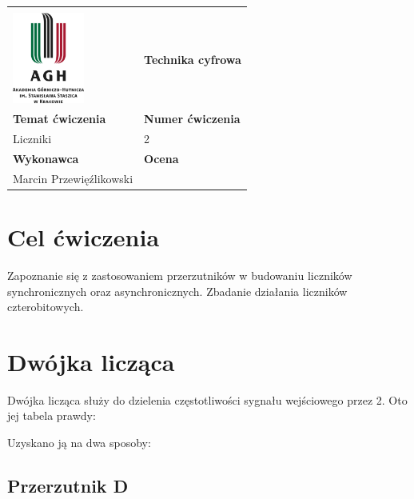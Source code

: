 \documentclass[12pt,a4paper]{article}
\begin{document}
\begin{table}[]
\label{my-label}
\begin{tabular}{|p{7.5cm}|p{7.5cm}|}
\hline
									           					&                           \\
\includegraphics[height=3cm]{logo}             					& \textbf{Technika cyfrowa} \\ \hline
\multicolumn{1}{|l|}{\textbf{Temat ćwiczenia}} 					& \textbf{Numer ćwiczenia}  \\
\multicolumn{1}{|l|}{Liczniki}	& 2                         \\ \hline
\multicolumn{1}{|l|}{\textbf{Wykonawca}}       & \textbf{Ocena}            \\
\multicolumn{1}{|l|}{Marcin Przewięźlikowski}          &                           \\ \hline
\end{tabular}
\end{table}

\section{Cel ćwiczenia}

Zapoznanie się z zastosowaniem przerzutników w budowaniu liczników synchronicznych oraz asynchronicznych. Zbadanie działania liczników czterobitowych.

\section{Dwójka licząca}

Dwójka licząca służy do dzielenia częstotliwości sygnału wejściowego przez 2. Oto jej tabela prawdy:





Uzyskano ją na dwa sposoby:

\subsection{Przerzutnik D}
\end{document}
